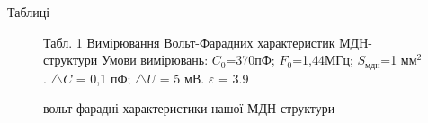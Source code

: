 \documentclass[a4paper,14pt]{extreport}
\begin{document}
\clearpage
\begin{center}Таблиці\\ \end{center}


\begin{figure}[h]
\caption{Табл. 1 Вимірювання Вольт-Фарадних характеристик МДН-структури
	Умови вимірювань: $C_0$=370пФ; $F_0$=1,44МГц; $S_{\text{мдн}}$=1 мм$^2$. $\triangle C$ = 0,1 пФ; $\triangle U$ = 5 мВ. $\varepsilon$ = 3.9}
\label{ris2}
\end{figure}



\newpage
\begin{figure}[h]
\caption{вольт-фарадні характеристики нашої МДН-структури}
\label{ris3}
\end{figure}
\end{document}
